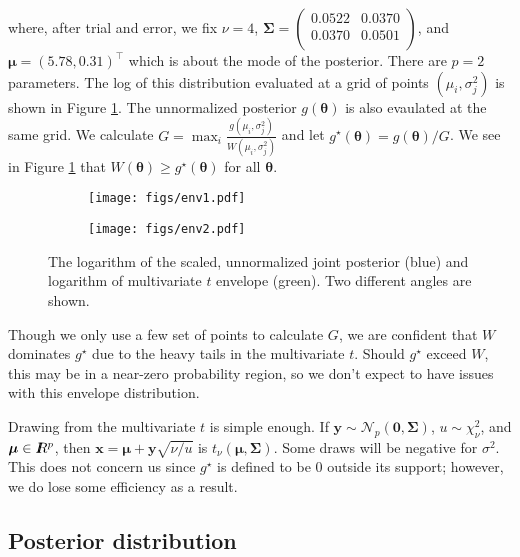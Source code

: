 \documentclass[12pt]{article}
\newcommand{\m}[1]{\mathbf{\bm{#1}}}
\newcommand{\R}{I\hspace{-4.4pt}R}
\begin{document}
\noindent where, after trial and error, we fix $\nu = 4$, $\m{\Sigma} = \left(\begin{array}{ll} 0.0522 & 0.0370 \\ 0.0370 & 0.0501 \\ \end{array}\right)$, and $\m{\mu}=(5.78, 0.31)^\top$ which is about the mode of the posterior. There are $p=2$ parameters. The log of this distribution evaluated at a grid of points $(\mu_i, \sigma^2_j)$ is shown in Figure \ref{envelope}. The unnormalized posterior $g(\m{\theta})$ is also evaulated at the same grid. We calculate $G=\max_i\frac{g(\mu_i,\sigma^2_j)}{W(\mu_i,\sigma^2_j)}$ and let $g^\star(\m{\theta}) = g(\m{\theta})/G$. We see in Figure \ref{envelope} that $W(\m{\theta})\geq g^\star(\m{\theta})$ for all $\m{\theta}$.
\bigskip

\begin{figure}
    \centering
    \begin{subfigure}{.5\textwidth}
        \centering
        \texttt{[image: figs/env1.pdf]}
    \end{subfigure}%
    \begin{subfigure}{.5\textwidth}
        \centering
        \texttt{[image: figs/env2.pdf]}
    \end{subfigure}
    \caption{The logarithm of the scaled, unnormalized joint posterior (blue) and logarithm of multivariate $t$ envelope (green). Two different angles are shown.}
    \label{envelope}
\end{figure}

\noindent Though we only use a few set of points to calculate $G$, we are confident that $W$ dominates $g^\star$ due to the heavy tails in the multivariate $t$. Should $g^\star$ exceed $W$, this may be in a near-zero probability region, so we don't expect to have issues with this envelope distribution.
\bigskip

\noindent Drawing from the multivariate $t$ is simple enough. If $\m{y}\sim\mathcal{N}_p(\m{0},\m{\Sigma})$, $u\sim\chi^2_\nu$, and $\m{\mu}\in\R^p$, then $\m{x}=\m{\mu}+\m{y}\sqrt{\nu/u}$ is $t_\nu(\m{\mu},\m{\Sigma})$. Some draws will be negative for $\sigma^2$. This does not concern us since $g^\star$ is defined to be $0$ outside its support; however, we do lose some efficiency as a result.

\subsection{Posterior distribution}
\end{document}
